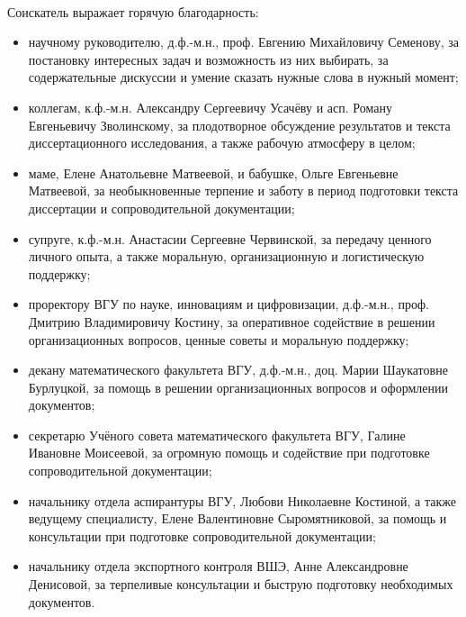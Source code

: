 

~~


Соискатель выражает горячую благодарность:
\begin{itemize}
	\item
		научному руководителю, д.ф.-м.н., проф. Евгению Михайловичу Семенову,
		за
		постановку интересных задач и возможность из них выбирать,
		за
		содержательные дискуссии
		и умение сказать нужные слова в нужный момент;
	\item
		коллегам, к.ф.-м.н. Александру Сергеевичу Усачёву и асп. Роману Евгеньевичу Зволинскому,
		за
		плодотворное обсуждение результатов и текста диссертационного исследования,
		а также рабочую атмосферу в целом;
	\item
		маме, Елене Анатольевне Матвеевой,
		и бабушке, Ольге Евгеньевне Матвеевой,
		за необыкновенные терпение и заботу
		в период подготовки текста диссертации и сопроводительной документации;
	\item
		супруге, к.ф.-м.н. Анастасии Сергеевне Червинской,
		за
		передачу ценного личного опыта,
		а также моральную, организационную и логистическую поддержку;
	\item
		проректору ВГУ по науке, инновациям и цифровизации, д.ф.-м.н., проф. Дмитрию Владимировичу Костину,
		за
		оперативное содействие в решении организационных вопросов, ценные советы и моральную поддержку;
	\item
		декану математического факультета ВГУ, д.ф.-м.н., доц. Марии Шаукатовне Бурлуцкой,
		за
		помощь в решении организационных вопросов и оформлении документов;
	\item
		секретарю Учёного совета математического факультета ВГУ, Галине Ивановне Моисеевой,
		за
		огромную помощь и содействие при подготовке сопроводительной документации;
	\item
		начальнику отдела аспирантуры ВГУ, Любови Николаевне Костиной, а также ведущему специалисту, Елене Валентиновне Сыромятниковой,
		за
		помощь и консультации при подготовке сопроводительной документации;
	\item
		начальнику отдела экспортного контроля ВШЭ, Анне Александровне Денисовой,
		за
		терпеливые консультации и быструю подготовку необходимых документов.
\end{itemize}
